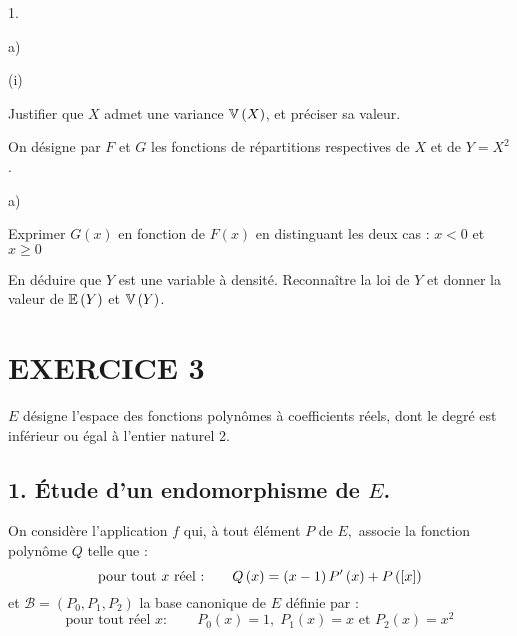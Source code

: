 \documentclass[11pt]{article}%
\begin{document}
\begin{noliste}{1.}
\begin{noliste}{a)}
\begin{nonoliste}{(i)}
\item Justifier que $X$ admet une variance $\mathbb{V}\left( X\right) $, et
préciser sa valeur.
\end{nonoliste}
\end{noliste}

\item On désigne par $F$ et $G$ les fonctions de répartitions
respectives de $X$ et de $Y = X^{2}$.

\begin{noliste}{a)}
 \setlength{\itemsep}{2mm}
\item Exprimer $G\left( x\right) $ en fonction de $F\left( x\right) $
en distinguant les deux cas : $x<0$ et $x\geq 0$

\item En déduire que $Y$ est une variable à densité. Reconnaître la loi
de $Y $ et donner la valeur de $\mathbb{E}\left( Y\right) $ et $\mathbb{V}\left(
Y\right) $.
\end{noliste}
\end{noliste}

\newpage

\section*{EXERCICE 3}

$E$ désigne l'espace des fonctions polynômes à coefficients réels, dont
le degré est inférieur ou égal à l'entier naturel 2.

\subsection*{1. Étude d'un endomorphisme de $E$.}

On considère l'application $f$ qui, à tout élément $P$ de $E, $ associe
la fonction polynôme $Q$ telle que : 
\[
\text{pour tout }x\text{ réel :\qquad }Q\left( x\right) = \left(
x-1\right)
P^{\prime }\left( x\right) + P\left(\left[ { x} \right]\right)
\]
et $\mathcal{B = }\left( P_{0},P_{1},P_{2}\right) $ la base canonique
de $E$ définie par : 
\[
\text{pour tout réel }x :\qquad P_{0}\left( x\right) = 1,\;P_{1}\left(
x\right) = x\text{ et }P_{2}\left( x\right) = x^{2}
\]
\end{document}
